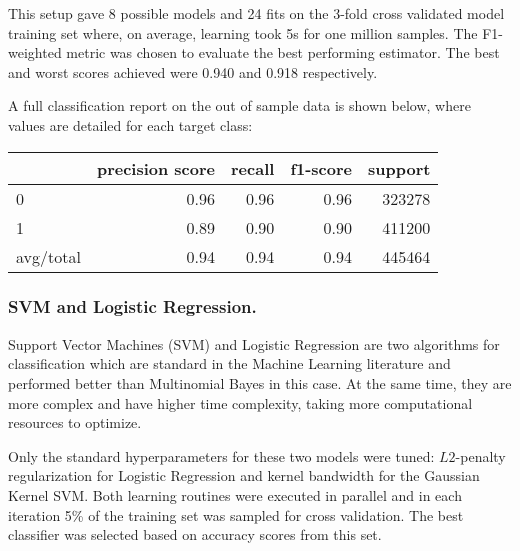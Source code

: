 This setup gave 8 possible models and 24 fits on the 3-fold cross validated model training set where, on average, learning took 5s for one million samples. The F1-weighted metric was chosen to evaluate the best performing estimator.
The best and worst scores achieved were 0.940 and 0.918 respectively. 

A full classification report on the out of sample data is shown below, where values are detailed for each target class:
\begin{table}[ht]
	\label{tab:classification_report}
	\centering
	\begin{tabular}{ l r r r r }
		\toprule
		{ } & precision score & recall & f1-score & support \\
		\midrule
		0 		 & 0.96 & 0.96 & 0.96 & 323278 \\
		1		 & 0.89 & 0.90 & 0.90 & 411200 \\
		avg/total & 0.94 & 0.94 & 0.94 & 445464 \\
		\bottomrule
	\end{tabular}
\end{table}


\subsubsection{SVM and Logistic Regression.}

Support Vector Machines (SVM) and Logistic Regression are two algorithms for classification which are standard in the Machine Learning literature and performed better than Multinomial Bayes in this case. 
At the same time, they are more complex and have higher time complexity, taking more computational resources to optimize.

Only the standard hyperparameters for these two models were tuned: $L2$-penalty regularization for Logistic Regression and kernel bandwidth for the Gaussian Kernel SVM.
Both learning routines were executed in parallel and in each iteration 5\% of the training set was sampled for cross validation. The best classifier was selected based on accuracy scores from this set.



